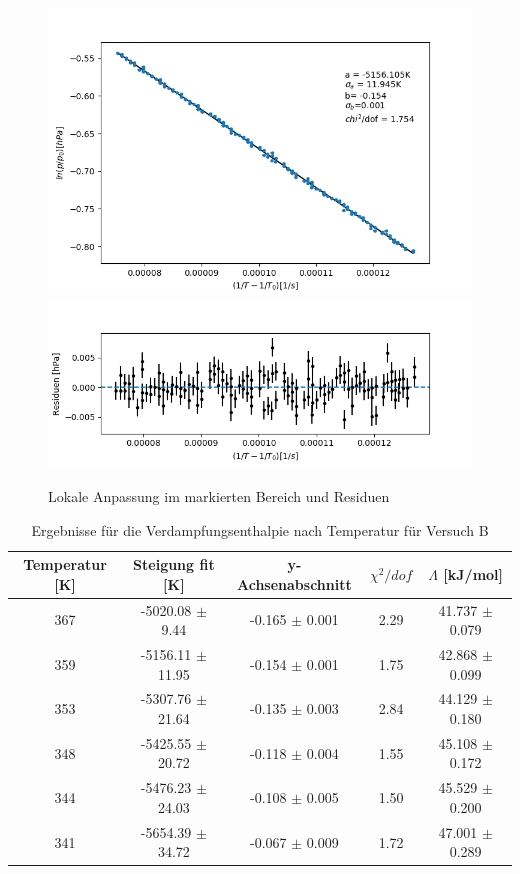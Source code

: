 \documentclass[12pt,a4paper]{article}
\begin{document}
\begin{figure}
\begin{center}
\includegraphics[width=\linewidth]{Bilder/lokaler_fit_2B}\\
\includegraphics[width=\linewidth]{Bilder/lokale_residuen_2B}
\caption[Lokale Anpassung]{Lokale Anpassung im markierten Bereich und Residuen}
\label{fig:fit_2B}
\end{center}
\end{figure}


\begin{table}
	\begin{tabular}{|c|c|c|c|c|}
		\hline
		\textbf{Temperatur [K]} & \textbf{Steigung fit [K]} & \textbf{y-Achsenabschnitt} & $\chi ^2/dof$ & \textbf{$\Lambda$ [kJ/mol]} \\
		\hline
		367 & -5020.08 $\pm$ 9.44 & -0.165 $\pm$ 0.001 & 2.29 & 41.737 $\pm$ 0.079 \\
		\hline
		359 & -5156.11 $\pm$ 11.95 & -0.154 $\pm$ 0.001 & 1.75 & 42.868 $\pm$ 0.099 \\
		\hline
		353 & -5307.76 $\pm$ 21.64 & -0.135 $\pm$ 0.003 & 2.84 & 44.129 $\pm$ 0.180 \\
		\hline
		348 & -5425.55 $\pm$ 20.72 & -0.118 $\pm$ 0.004 & 1.55 & 45.108 $\pm$ 0.172 \\
		\hline
		344 & -5476.23 $\pm$ 24.03 & -0.108 $\pm$ 0.005 & 1.50 & 45.529 $\pm$ 0.200 \\
		\hline
		341 & -5654.39 $\pm$ 34.72 & -0.067 $\pm$ 0.009 & 1.72 & 47.001 $\pm$ 0.289 \\
		\hline
	\end{tabular}
	\caption{Ergebnisse für die Verdampfungsenthalpie nach Temperatur für Versuch B}
	\label{tab:enthalpie_B}
\end{table}
\end{document}
